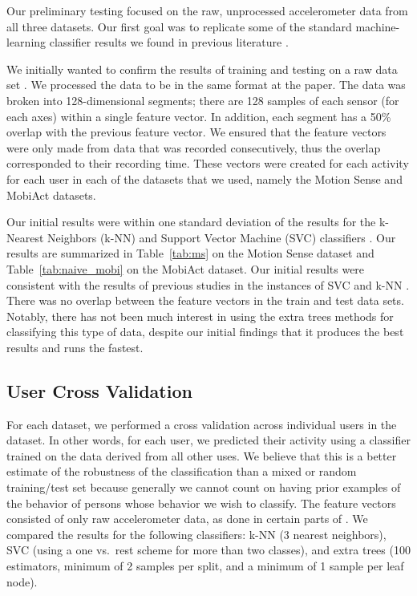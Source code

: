 Our preliminary testing focused on the raw, unprocessed accelerometer data from all three datasets. Our first goal was to replicate some of the standard machine-learning classifier results we found in previous literature \cite{ferrari2019hand}.

We initially wanted to confirm the results of training and testing on a raw data set \cite{ferrari2019hand}. We processed the data to be in the same format at the paper. The data was broken into 128-dimensional segments; there are 128 samples of each sensor (for each axes) within a single feature vector. In addition, each segment has a 50\% overlap with the previous feature vector. We ensured that the feature vectors were only made from data that was recorded consecutively, thus the overlap corresponded to their recording time. These vectors were created for each activity for each user in each of the datasets that we used, namely the Motion Sense and MobiAct datasets.

Our initial results were within one standard deviation of the results for the k-Nearest Neighbors (k-NN) and Support Vector Machine (SVC) classifiers \cite{ferrari2019hand}. Our results are summarized in Table~\ref{tab:ms} on the Motion Sense dataset and Table~\ref{tab:naive_mobi} on the MobiAct dataset. Our initial results were consistent with the results of previous studies in the instances of SVC and k-NN \cite{ferrari2019hand, he2016deep, ferrari2019homogenization}.  There was no overlap between the feature vectors in the train and test data sets. Notably, there has not been much interest in using the extra trees methods for classifying this type of data, despite our initial findings that it produces the best results and runs the fastest. 


\subsection{User Cross Validation}
\label{sub:user_cross_val}

For each dataset, we performed a cross validation across individual users in the dataset. In other words, for each user, we predicted their activity using a classifier trained on the data derived from all other uses. We believe that this is a better estimate of the robustness of the classification than a mixed or random training/test set because generally we cannot count on having prior examples of the behavior of persons whose behavior we wish to classify. The feature vectors consisted of only raw accelerometer data, as done in certain parts of \cite{ferrari2019hand}. We compared the results for the following classifiers: k-NN (3 nearest neighbors), SVC (using a one vs.\ rest scheme for more than two classes), and extra trees (100 estimators, minimum of 2 samples per split, and a minimum of 1 sample per leaf node).

